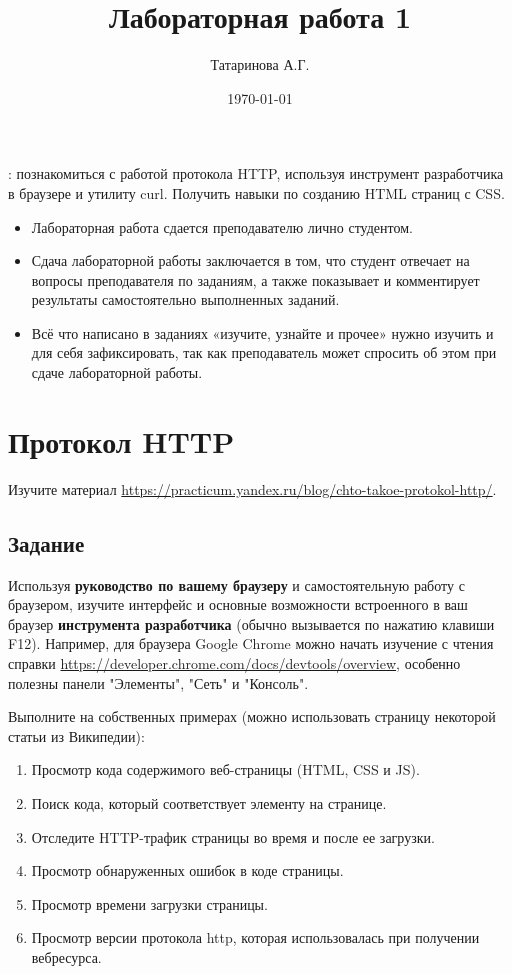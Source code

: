 \documentclass[a4paper,12pt]{extarticle}
\author{Татаринова А.Г.}
\title{Лабораторная работа 1}
\date{\today}
\begin{document}
\maketitle

: познакомиться с работой протокола HTTP, используя инструмент разработчика в браузере и утилиту curl. Получить навыки по созданию HTML страниц с CSS.
\begin{itemize}
    \item Лабораторная работа сдается преподавателю лично студентом.
    \item Сдача лабораторной работы заключается в том, что студент отвечает на вопросы преподавателя по заданиям, а также показывает и комментирует результаты самостоятельно выполненных заданий.
    \item Всё что написано в заданиях «изучите, узнайте и прочее» нужно изучить и для себя зафиксировать, так как преподаватель может спросить об этом при сдаче лабораторной работы.
\end{itemize}

\section{Протокол HTTP}
Изучите материал \url{https://practicum.yandex.ru/blog/chto-takoe-protokol-http/}.
\subsection{Задание}

Используя \textbf{руководство по вашему браузеру} и самостоятельную работу с браузером, изучите интерфейс и основные возможности встроенного в ваш браузер \textbf{инструмента разработчика} (обычно вызывается по нажатию клавиши F12). Например, для браузера Google Chrome можно начать изучение с чтения справки \url{https://developer.chrome.com/docs/devtools/overview}, особенно полезны панели "Элементы", "Сеть" и "Консоль".

Выполните на собственных примерах (можно использовать страницу некоторой статьи из Википедии):
\begin{enumerate}[label=\alph*)]
  \item Просмотр кода содержимого веб-страницы (HTML, CSS и JS).
  \item Поиск кода, который соответствует элементу на странице.
  \item Отследите HTTP-трафик страницы во время и после ее загрузки.
  \item Просмотр обнаруженных ошибок в коде страницы.
  \item Просмотр времени загрузки страницы.
  \item Просмотр версии протокола http, которая использовалась при получении веб\-ресурса.
\end{enumerate}
\end{document}
